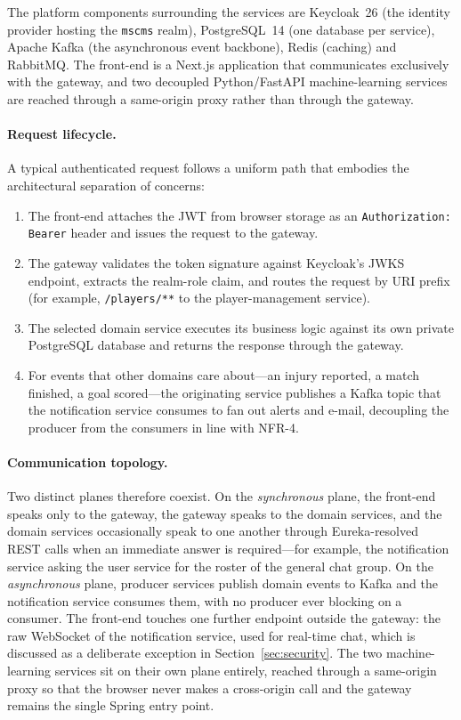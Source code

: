 The platform components surrounding the services are Keycloak~26 (the identity
provider hosting the \texttt{mscms} realm), PostgreSQL~14 (one database per service),
Apache Kafka (the asynchronous event backbone), Redis (caching) and RabbitMQ. The
front-end is a Next.js application that communicates exclusively with the gateway,
and two decoupled Python/FastAPI machine-learning services are reached through a
same-origin proxy rather than through the gateway.

\paragraph{Request lifecycle.} A typical authenticated request follows a uniform path
that embodies the architectural separation of concerns:
\begin{enumerate}
  \item The front-end attaches the JWT from browser storage as an
  \texttt{Authorization: Bearer} header and issues the request to the gateway.
  \item The gateway validates the token signature against Keycloak's JWKS endpoint,
  extracts the realm-role claim, and routes the request by URI prefix (for example,
  \texttt{/players/**} to the player-management service).
  \item The selected domain service executes its business logic against its own
  private PostgreSQL database and returns the response through the gateway.
  \item For events that other domains care about---an injury reported, a match
  finished, a goal scored---the originating service publishes a Kafka topic that the
  notification service consumes to fan out alerts and e-mail, decoupling the producer
  from the consumers in line with NFR-4.
\end{enumerate}

\paragraph{Communication topology.} Two distinct planes therefore coexist. On the
\emph{synchronous} plane, the front-end speaks only to the gateway, the gateway speaks
to the domain services, and the domain services occasionally speak to one another
through Eureka-resolved REST calls when an immediate answer is required---for
example, the notification service asking the user service for the roster of the
general chat group. On the \emph{asynchronous} plane, producer services publish domain
events to Kafka and the notification service consumes them, with no producer ever
blocking on a consumer. The front-end touches one further endpoint outside the
gateway: the raw WebSocket of the notification service, used for real-time chat, which
is discussed as a deliberate exception in Section~\ref{sec:security}. The two
machine-learning services sit on their own plane entirely, reached through a
same-origin proxy so that the browser never makes a cross-origin call and the gateway
remains the single Spring entry point.

